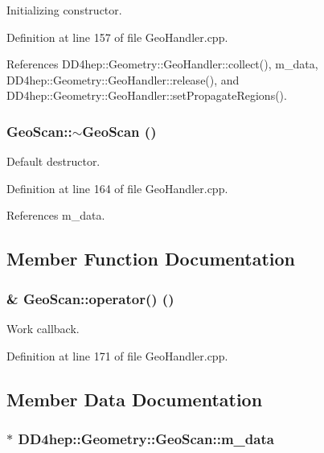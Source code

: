 Initializing constructor. 

Definition at line 157 of file GeoHandler.cpp.

References DD4hep::Geometry::GeoHandler::collect(), m\_\-data, DD4hep::Geometry::GeoHandler::release(), and DD4hep::Geometry::GeoHandler::setPropagateRegions().\hypertarget{class_d_d4hep_1_1_geometry_1_1_geo_scan_afc8fa45ac2fd4eee7b0a3a8d355ec218}{
\subsubsection[{$\sim$GeoScan}]{\setlength{\rightskip}{0pt plus 5cm}GeoScan::$\sim$GeoScan ()}}
\label{class_d_d4hep_1_1_geometry_1_1_geo_scan_afc8fa45ac2fd4eee7b0a3a8d355ec218}


Default destructor. 

Definition at line 164 of file GeoHandler.cpp.

References m\_\-data.

\subsection{Member Function Documentation}
\hypertarget{class_d_d4hep_1_1_geometry_1_1_geo_scan_aa6914b5e822dcf712d110644b4c202f1}{
\subsubsection[{operator()}]{ \& GeoScan::operator() ()}}
\label{class_d_d4hep_1_1_geometry_1_1_geo_scan_aa6914b5e822dcf712d110644b4c202f1}


Work callback. 

Definition at line 171 of file GeoHandler.cpp.

\subsection{Member Data Documentation}
\hypertarget{class_d_d4hep_1_1_geometry_1_1_geo_scan_a03dadf49cd85c4b8702872ee8df66fc1}{
\subsubsection[{m\_\-data}]{$\ast$ {\bf DD4hep::Geometry::GeoScan::m\_\-data}}}
\label{class_d_d4hep_1_1_geometry_1_1_geo_scan_a03dadf49cd85c4b8702872ee8df66fc1}


